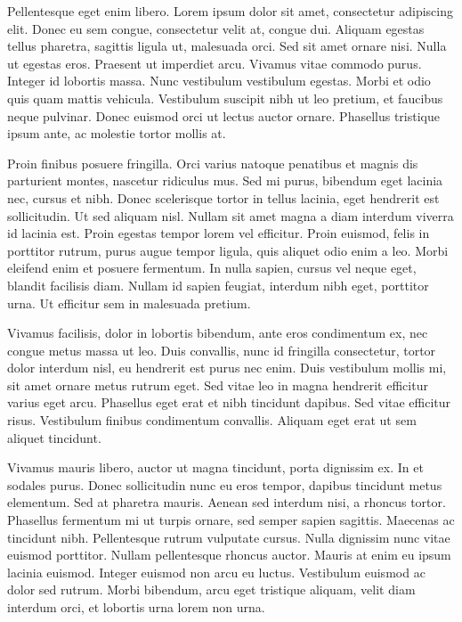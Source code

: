 Pellentesque eget enim libero. Lorem ipsum dolor sit amet, consectetur adipiscing elit. Donec eu sem congue, consectetur velit at, congue dui. Aliquam egestas tellus pharetra, sagittis ligula ut, malesuada orci. Sed sit amet ornare nisi. Nulla ut egestas eros. Praesent ut imperdiet arcu. Vivamus vitae commodo purus. Integer id lobortis massa. Nunc vestibulum vestibulum egestas. Morbi et odio quis quam mattis vehicula. Vestibulum suscipit nibh ut leo pretium, et faucibus neque pulvinar. Donec euismod orci ut lectus auctor ornare. Phasellus tristique ipsum ante, ac molestie tortor mollis at.

Proin finibus posuere fringilla. Orci varius natoque penatibus et magnis dis parturient montes, nascetur ridiculus mus. Sed mi purus, bibendum eget lacinia nec, cursus et nibh. Donec scelerisque tortor in tellus lacinia, eget hendrerit est sollicitudin. Ut sed aliquam nisl. Nullam sit amet magna a diam interdum viverra id lacinia est. Proin egestas tempor lorem vel efficitur. Proin euismod, felis in porttitor rutrum, purus augue tempor ligula, quis aliquet odio enim a leo. Morbi eleifend enim et posuere fermentum. In nulla sapien, cursus vel neque eget, blandit facilisis diam. Nullam id sapien feugiat, interdum nibh eget, porttitor urna. Ut efficitur sem in malesuada pretium.

Vivamus facilisis, dolor in lobortis bibendum, ante eros condimentum ex, nec congue metus massa ut leo. Duis convallis, nunc id fringilla consectetur, tortor dolor interdum nisl, eu hendrerit est purus nec enim. Duis vestibulum mollis mi, sit amet ornare metus rutrum eget. Sed vitae leo in magna hendrerit efficitur varius eget arcu. Phasellus eget erat et nibh tincidunt dapibus. Sed vitae efficitur risus. Vestibulum finibus condimentum convallis. Aliquam eget erat ut sem aliquet tincidunt.

Vivamus mauris libero, auctor ut magna tincidunt, porta dignissim ex. In et sodales purus. Donec sollicitudin nunc eu eros tempor, dapibus tincidunt metus elementum. Sed at pharetra mauris. Aenean sed interdum nisi, a rhoncus tortor. Phasellus fermentum mi ut turpis ornare, sed semper sapien sagittis. Maecenas ac tincidunt nibh. Pellentesque rutrum vulputate cursus. Nulla dignissim nunc vitae euismod porttitor. Nullam pellentesque rhoncus auctor. Mauris at enim eu ipsum lacinia euismod. Integer euismod non arcu eu luctus. Vestibulum euismod ac dolor sed rutrum. Morbi bibendum, arcu eget tristique aliquam, velit diam interdum orci, et lobortis urna lorem non urna.

